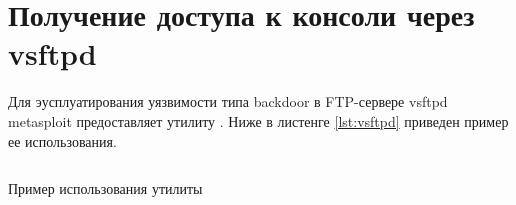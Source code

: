\section{Получение доступа к консоли через vsftpd}

Для эусплуатирования уязвимости типа backdoor в FTP-сервере vsftpd metasploit предоставляет утилиту . 
Ниже в листенге \ref{lst:vsftpd} приведен пример ее использования.


\begin{listing}[H]
    \inputminted{console}{resources/vsftpd/00_vsftpd}
    \caption{Пример использования утилиты }
    \label{lst:vsftpd}
\end{listing}